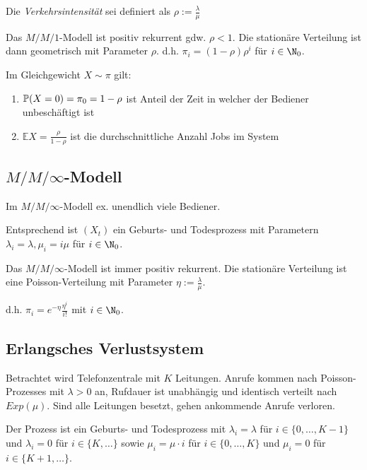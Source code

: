 Die \emph{Verkehrsintensität} sei definiert als $\rho := \frac{\lambda}{\mu}$

\spacing

Das $M/M/1$-Modell ist positiv rekurrent gdw. $\rho < 1$. Die stationäre Verteilung ist dann geometrisch mit Parameter $\rho$. d.h. $\pi_i = (1-\rho)\rho^i$ für $i \in \N_0$.

\vspace*{1mm}

Im Gleichgewicht $X \sim \pi$ gilt:

\begin{enumerate}[label=(\alph*)]
	\item $\P(X=0) = \pi_0 = 1 - \rho$ ist Anteil der Zeit in welcher der Bediener unbeschäftigt ist
	\item $\mathbb{E}X = \frac{\rho}{1-\rho}$ ist die durchschnittliche Anzahl Jobs im System
\end{enumerate}

\subsection*{$M/M/\infty$-Modell}

Im $M/M/\infty$-Modell ex. unendlich viele Bediener.

Entsprechend ist $(X_t)$ ein Geburts- und Todesprozess mit Parametern $\lambda_i = \lambda, \mu_i = i\mu$ für $i \in \N_0$.

\vspace*{1mm}

Das $M/M/\infty$-Modell ist immer positiv rekurrent. Die stationäre Verteilung ist eine Poisson-Verteilung mit Parameter $\eta := \frac{\lambda}{\mu}$.

d.h. $\pi_i = e^{-\eta}\frac{\eta^i}{i!}$ mit $i \in \N_0$.

\subsection*{Erlangsches Verlustsystem}

Betrachtet wird Telefonzentrale mit $K$ Leitungen. Anrufe kommen nach Poisson-Prozesses mit $\lambda > 0$ an, Rufdauer ist unabhängig und identisch verteilt nach $Exp(\mu)$. Sind alle Leitungen besetzt, gehen ankommende Anrufe verloren.

Der Prozess ist ein Geburts- und Todesprozess mit $\lambda_i = \lambda$ für $i \in \{0,\dots,K-1\}$ und $\lambda_i = 0$ für $i \in \{K,\dots\}$ sowie $\mu_i = \mu \cdot i$ für $i \in \{0,\dots,K\}$ und $\mu_i = 0$ für $i \in \{K+1,\dots\}$.


